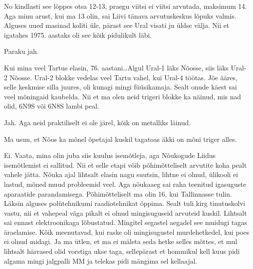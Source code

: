 
No kindlasti see lõppes otsa 12-13, praegu viitsi ei viitsi arvutada, maksimum 
14. Aga minu arust, kui ma 13 olin, sai Liivi tänava arvutuskeskus lõpuks valmis. Alguses uued masinad koliti üle, 
pärast see Ural visati ju üldse välja. Nii et igatahes 1975. 
aastaks oli see kõik pidulikult läbi. 


Paraku jah. 

Kui mina veel Tartus elasin, 76. aastani\ldots Algul Ural-1 
läks Nõosse, siis läks Ural-2 Nõosse. Ural-2 
blokke vedelas veel Tartu vahel,  kui Ural-4 töötas. Jõe 
ääres, selle keskmise silla juures,  oli kunagi mingi füüsikamaja. Sealt onude 
käest sai veel mõningaid kaubelda. Nii et ma olen neid trigeri blokke ka 
näinud, mis nad olid, 6N9S või 6N8S lambi peal. 


Jah. Aga neid praktiliselt ei ole järel,  kõik on  metalliks läinud. 


Ma usun, et Nõos ka mõnel õpetajal kuskil tagatoas äkki on mõni triger alles. 


Ei. Vaata, mina olin juba siis kuulus isemõtleja, aga Nõukogude Liidus 
isemõtlemist ei sallitud. Nii et selle etapi võib  põhimõtteliselt arvutite 
koha pealt vahele jätta. Nõuka ajal lihtsalt elasin nagu suutsin, lihtne ei 
olnud, ülikooli ei lastud, mõned muud probleemid veel. Aga nõukaaeg sai raha 
teenitud igasuguste aparaatide parandamisega. Põhimõtteliselt ma olin 16, kui 
Tallinnasse tulin. Läksin alguses  polütehnikumi 
raadiotehnikat õppima. Sealt tuli kirg tinutuskolvi vastu, nii et vahepeal väga 
pikalt ei olnud mingisuguseid arvuteid kuskil. Lihtsalt sai ennast 
elektroonikaga lõbustatud. Mingitel segastel aegadel see muidugi tagas 
äraelamise. Kõik meenutavad, kui raske oli mingisugustel murdehetkedel, kui 
poes ei olnud midagi. Ja ma ütlen, et ma ei mäleta seda hetke selles mõttes, et 
mul lihtsalt härrased olid vorstiga ukse taga, sellepärast et hommikul kell 
kuus pidi algama mingi jalgpalli MM  ja telekas pidi mängima sel kellaajal. 

